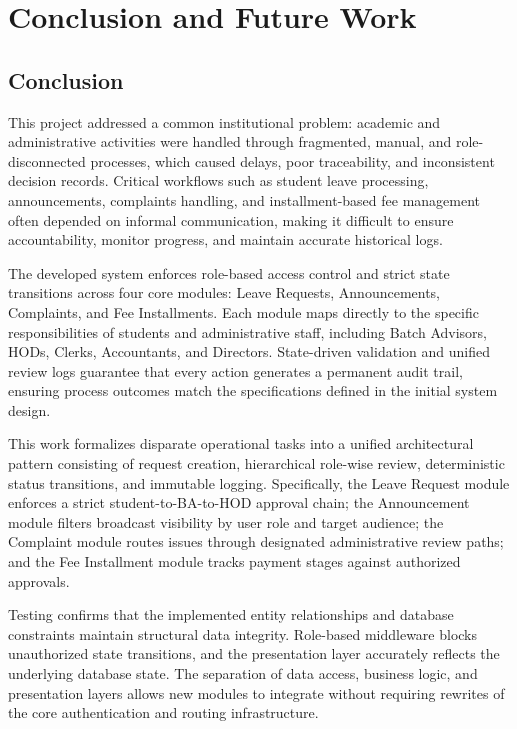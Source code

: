 
\chapter{Conclusion and Future Work}


\section{Conclusion}

This project addressed a common institutional problem: academic and administrative activities were handled through fragmented, manual, and role-disconnected processes, which caused delays, poor traceability, and inconsistent decision records. Critical workflows such as student leave processing, announcements, complaints handling, and installment-based fee management often depended on informal communication, making it difficult to ensure accountability, monitor progress, and maintain accurate historical logs.

The developed system enforces role-based access control and strict state transitions across four core modules: Leave Requests, Announcements, Complaints, and Fee Installments. Each module maps directly to the specific responsibilities of students and administrative staff, including Batch Advisors, HODs, Clerks, Accountants, and Directors. State-driven validation and unified review logs guarantee that every action generates a permanent audit trail, ensuring process outcomes match the specifications defined in the initial system design.

This work formalizes disparate operational tasks into a unified architectural pattern consisting of request creation, hierarchical role-wise review, deterministic status transitions, and immutable logging. Specifically, the Leave Request module enforces a strict student-to-BA-to-HOD approval chain; the Announcement module filters broadcast visibility by user role and target audience; the Complaint module routes issues through designated administrative review paths; and the Fee Installment module tracks payment stages against authorized approvals.

Testing confirms that the implemented entity relationships and database constraints maintain structural data integrity. Role-based middleware blocks unauthorized state transitions, and the presentation layer accurately reflects the underlying database state. The separation of data access, business logic, and presentation layers allows new modules to integrate without requiring rewrites of the core authentication and routing infrastructure.

